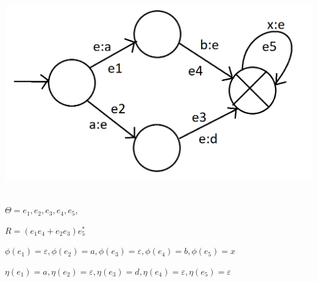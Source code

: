 \begin{minipage}[r]{0.15\linewidth} 
    \includegraphics[width=2\linewidth]{images/29_7.png}
\end{minipage} \\

$\Theta = {e_1, e_2, e_3, e_4, e_5}$, 

$R = (e_1 e_4 + e_2 e_3)e_5^*$

$\phi(e_1) = \varepsilon, \phi(e_2) = a, \phi(e_3) = \varepsilon, \phi(e_4) = b, \phi(e_5) = x$

$\eta(e_1) = a, \eta(e_2) = \varepsilon, \eta(e_3) = d, \eta(e_4) = \varepsilon, \eta(e_5) = \varepsilon$